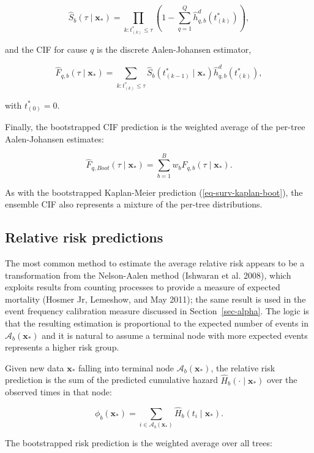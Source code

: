 \documentclass[
  letterpaper,
  krantz2]{style/krantz}
\begin{document}
\[
\hat{S}_b(\tau \mid \mathbf{x}_*) = \prod_{k: t^*_{(k)} \leq \tau} \left(1 - \sum_{q=1}^Q \hat{h}^d_{q,b}(t^*_{(k)})\right),
\]

and the CIF for cause \(q\) is the discrete Aalen-Johansen estimator,

\[
\hat{F}_{q,b}(\tau \mid \mathbf{x}_*) = \sum_{k: t^*_{(k)} \leq \tau} \hat{S}_b(t^*_{(k-1)} \mid \mathbf{x}_*) \hat{h}^d_{q,b}(t^*_{(k)}),
\]

with \(t^*_{(0)} = 0\).

Finally, the bootstrapped CIF prediction is the weighted average of the
per-tree Aalen-Johansen
estimates:

\[
\hat{F}_{q,Boot}(\tau \mid \mathbf{x}_*) = \sum_{b=1}^B w_b\hat{F}_{q,b}(\tau \mid \mathbf{x}_*).
\]

As with the bootstrapped Kaplan-Meier prediction
(\ref{eq-surv-kaplan-boot}), the ensemble CIF also represents a mixture
of the per-tree distributions.

\subsection{Relative risk predictions}\label{sec-rsf-risks}

The most common method to estimate the average relative risk appears to
be a transformation from the Nelson-Aalen method (Ishwaran et al. 2008),
which exploits results from counting processes to provide a measure of
expected mortality (Hosmer Jr, Lemeshow, and May 2011); the same result
is used in the event frequency calibration measure discussed in
Section~\ref{sec-alpha}.
The logic is that the resulting estimation is proportional to the
expected number of events in \(\mathcal{A}_b(\mathbf{x}_*)\) and it is
natural to assume a terminal node with more expected events represents a
higher risk group.

Given new data \(\mathbf{x}_*\) falling into terminal node
\(\mathcal{A}_b(\mathbf{x}_*)\), the relative risk prediction is the sum
of the predicted cumulative hazard
\(\hat{H}_b(\cdot \mid \mathbf{x}_*)\) over the observed times in that
node:

\[
\phi_b(\mathbf{x}_*) = \sum_{i \in \mathcal{A}_b(\mathbf{x}_*)} \hat{H}_b(t_i \mid \mathbf{x}_*).
\]

The bootstrapped risk prediction is the weighted average over all trees:
\end{document}
